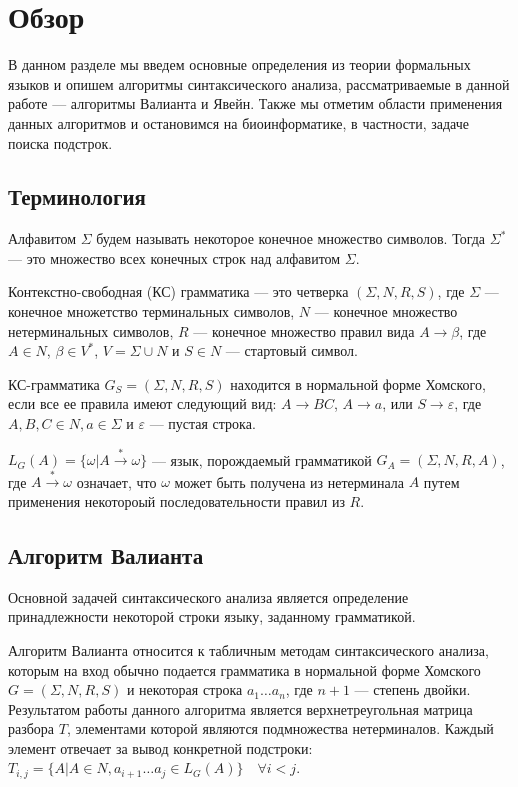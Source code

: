 \section{Обзор}

В данном разделе мы введем основные определения из теории формальных языков и опишем алгоритмы синтаксического анализа, рассматриваемые в данной работе --- алгоритмы Валианта и Явейн. Также мы отметим области применения данных алгоритмов и остановимся на биоинформатике, в частности, задаче поиска подстрок.

\subsection{Терминология}

Алфавитом $\Sigma$ будем называть некоторое конечное множество символов.
Тогда $\Sigma^{*}$ --- это множество всех конечных строк над алфавитом $\Sigma$.

Контекстно-свободная (КС) грамматика --- это четверка $(\Sigma, N, R, S)$, где $\Sigma$ --- конечное множетство терминальных символов, $N$ --- конечное множество нетерминальных символов, $R$ --- конечное множество правил вида $A \rightarrow \beta$, где $A \in N$, $\beta \in V^{*}$, $V = \Sigma \cup N$ и $S \in N$ --- стартовый символ.

КС-грамматика $G_S = (\Sigma, N, R, S)$ находится в нормальной форме Хомского, если все ее правила имеют следующий вид: $A \rightarrow BC$, $A \rightarrow a$, или $S \rightarrow \varepsilon$,
где $A, B, C \in N, a \in \Sigma$ и $\varepsilon$ --- пустая строка.

$L_{G}(A) = \{ \omega | A\xrightarrow{*} \omega\}$ --- язык, порождаемый грамматикой $G_{A} = (\Sigma, N, R, A)$, где $A \xrightarrow{*} \omega$ означает, что $\omega$ может быть получена из нетерминала $A$ путем применения некотороый последовательности правил из $R$.

\subsection{Алгоритм Валианта}

Основной задачей синтаксического анализа является определение принадлежности некоторой строки языку, заданному грамматикой.

Алгоритм Валианта относится к табличным методам синтаксического анализа, которым на вход обычно подается грамматика в нормальной форме Хомского $G = (\Sigma, N, R, S)$ и некоторая строка $a_{1} \dots a_{n}$, где $n + 1$ --- степень двойки. Результатом работы данного алгоритма является верхнетреугольная матрица разбора $T$, элементами которой являются подмножества нетерминалов. Каждый элемент отвечает за вывод конкретной подстроки: $T_{i, j} =  \{ A | A \in N, a_{i + 1} \dots a_{j} \in L_{G}(A)\} \quad \forall i < j$.

